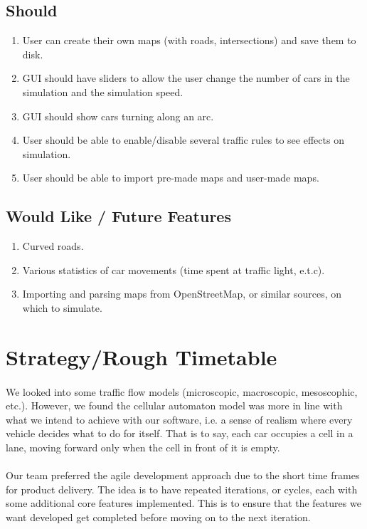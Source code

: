 \documentclass[11pt, a4paper]{article}
\begin{document}
\subsection{Should} \label{sub:should}
\begin{enumerate}[itemsep = -1ex]
\item User can create their own maps (with roads, intersections) and save them to disk.
\item GUI should have sliders to allow the user change the number of cars in the simulation and the simulation speed.
\item GUI should show cars turning along an arc.
\item User should be able to enable/disable several traffic rules to see effects on simulation.
\item User should be able to import pre-made maps and user-made maps.
\end{enumerate}

\subsection{Would Like / Future Features } \label{sub:would}
\begin{enumerate}[itemsep = -1ex]
\item Curved roads.
\item Various statistics of car movements (time spent at traffic light, e.t.c).
\item Importing and parsing maps from OpenStreetMap, or similar sources, on which to simulate.
\end{enumerate}

\section{Strategy/Rough Timetable}\label{dev:meth}
\paragraph{}
We looked into some traffic flow models (microscopic, macroscopic, mesoscophic, etc.). However, we found the cellular automaton model was more in line with what we intend to achieve with our software, i.e. a sense of realism where every vehicle decides what to do for itself. That is to say, each car occupies a cell in a lane, moving forward only when the cell in front of it is empty.
\paragraph{}
Our team preferred the agile development approach due to the short time frames for product delivery. The idea is to have repeated iterations, or cycles, each with some additional core features implemented. This is to ensure that the features we want developed get completed before moving on to the next iteration.
\end{document}
